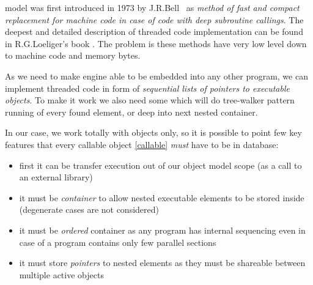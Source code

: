 \clearpage
{}\label{threaded}\secdown

 model was first introduced in 1973 by J.R.Bell
\cite{jrbell}\ as \textit{method of fast and \emph{compact} replacement for
machine code in case of \emph{code with deep subroutine callings}}. The deepest
and detailed description of threaded code implementation can be found in
R.G.Loeliger's book \cite{loeliger}. The problem is these methods have very low
level down to machine code and memory bytes.

As we need to make engine able to be embedded into any other program, we can
implement threaded code in form of \textit{sequential lists of pointers to
executable objects}. To make it work we also need some  which will do tree-walker pattern running of every found element,
or deep into next nested container.

\pg
In our case, we work totally with objects only, so it is possible to point few
key features that every callable object \ref{callable} \emph{must} have to be
 in database:
\begin{itemize}[nosep]
  \item first it can be  transfer execution out of our object
  model scope (as a call to an external library)
  \item it must be \emph{container} to allow nested executable elements to be
  stored inside (degenerate cases are not considered)
  \item it must be \emph{ordered} container as any program has internal
  sequencing even in case of a program contains only few parallel sections
  \item it must store \emph{pointers} to nested elements as they must be
  shareable between multiple active objects
\end{itemize}

\secup
